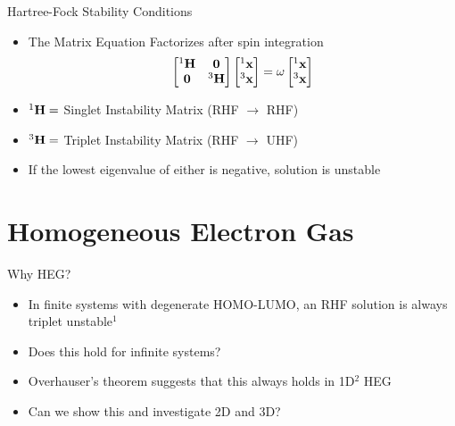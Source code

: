 \documentclass[10pt]{beamer}
\begin{document}
{{{{{%
\begin{frame}{Hartree-Fock Stability Conditions}
	\begin{itemize}
		\item {The Matrix Equation Factorizes after spin integration
					\begin{eqnarray*}
						\begin{bmatrix}
							{}^1\bf{H}   & \bf{0}   \\
							\bf{0} & {}^3\bf{H} \\
						\end{bmatrix}
						\begin{bmatrix}  {}^1\bf{x} \\ {}^3\bf{x}  \end{bmatrix}
						= \omega \begin{bmatrix}  {}^1\bf{x} \\ {}^3\bf{x}  \end{bmatrix}
					\end{eqnarray*}
		}
		\item {${}^1\bf{H} = $ Singlet Instability Matrix (RHF $\rightarrow$ RHF) }
		\item {${}^3\bf{H} = $ Triplet Instability Matrix (RHF $\rightarrow$ UHF) }
		\item {If the lowest eigenvalue of either is negative, solution is unstable }
	\end{itemize}
\end{frame}

\section{Homogeneous Electron Gas}

{%
\begin{frame}{Why HEG?}
 \begin{itemize} 
   \item{ In finite systems with degenerate HOMO-LUMO, an RHF solution is always triplet 
   unstable${}^1$ }
   \item{ Does this hold for infinite systems? }
   \item{ Overhauser's theorem suggests that this always holds in 1D$^2$ HEG }
   \item{ Can we show this and investigate 2D and 3D? }
 \end{itemize}


\end{frame}}}}}}}
\end{document}
